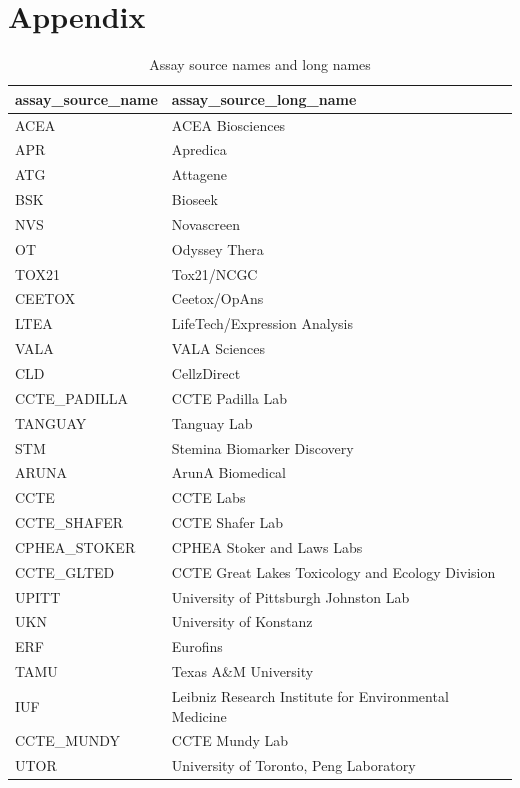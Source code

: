\chapter{Appendix}\label{chap:appendix}
\begin{table}
    \begin{center}
    \caption{Assay source names and long names}
    \begin{tabular}{ll}
        \toprule
        assay\_source\_name & assay\_source\_long\_name \\
        \midrule
        ACEA & ACEA Biosciences \\
        APR & Apredica \\
        ATG & Attagene \\
        BSK & Bioseek \\
        NVS & Novascreen \\
        OT & Odyssey Thera \\
        TOX21 & Tox21/NCGC \\
        CEETOX & Ceetox/OpAns \\
        LTEA & LifeTech/Expression Analysis \\
        VALA & VALA Sciences \\
        CLD & CellzDirect \\
        CCTE\_PADILLA & CCTE Padilla Lab \\
        TANGUAY & Tanguay Lab \\
        STM & Stemina Biomarker Discovery \\
        ARUNA & ArunA Biomedical \\
        CCTE & CCTE Labs \\
        CCTE\_SHAFER & CCTE Shafer Lab \\
        CPHEA\_STOKER & CPHEA Stoker and Laws Labs \\
        CCTE\_GLTED & CCTE Great Lakes Toxicology and Ecology Division \\
        UPITT & University of Pittsburgh Johnston Lab \\
        UKN & University of Konstanz \\
        ERF & Eurofins \\
        TAMU & Texas A\&M University \\
        IUF & Leibniz Research Institute for Environmental Medicine \\
        CCTE\_MUNDY & CCTE Mundy Lab \\
        UTOR & University of Toronto, Peng Laboratory \\
        \bottomrule
    \end{tabular}
    ~\label{tab:laboratories} 
\end{center}
\end{table}

